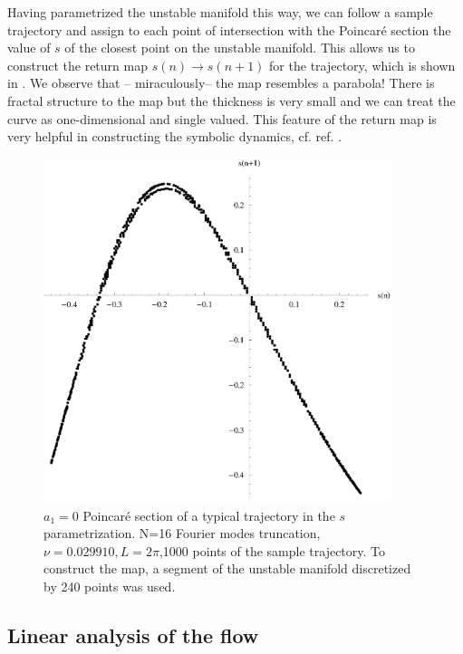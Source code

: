 \documentclass[pre,preprint,groupedaddress,showpacs,showkeys]{revtex4}
\begin{document}
  Having parametrized the unstable manifold this way, we can follow a
  sample trajectory and assign to each point of intersection with the
  Poincar\'e section the value of $s$ of the closest point on the
  unstable manifold.  This allows us to construct the return map
  $s(n)\rightarrow s(n+1)$ for the trajectory, which is shown in
  . We observe that -- miraculously-- the map
  resembles a parabola! There is fractal structure to the map but the
  thickness is very small and we can treat the curve as
  one-dimensional and single valued. This feature of the return map
  is very helpful in constructing the symbolic dynamics, cf. ref. \cite{Christiansen:97}.

  \begin{figure}[h!]
      \includegraphics[width=4in]{figs/sPoincarePlot.eps}
      \caption{ $a_1=0$ Poincar\'e section of a typical trajectory in
        the $s$ parametrization. N=16 Fourier modes truncation,
        $\nu=0.029910, L=2\pi$,1000 points of the sample trajectory.
        To construct the map, a segment of the
        unstable manifold discretized by 240 points was used.
      }
  \label{fig:sPoincare}
  \end{figure}



 \subsection{Linear analysis of the flow}
\end{document}
